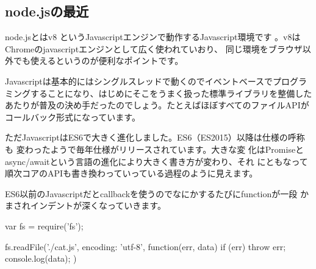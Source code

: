 \documentclass[mingoth,a4paper]{jsarticle}
\begin{document}

\begin{multicols}{2}
{\small

}
\end{multicols}

%
%
%
%




\subsection{node.jsの最近}

node.jsとはv8 というJavascriptエンジンで動作するJavascript環境です
\cite{nodejsorg}。v8はChromeのjavascriptエンジンとして広く使われていおり、
同じ環境をブラウザ以外でも使えるというのが便利なポイントです。

Javascriptは基本的にはシングルスレッドで動くのでイベントベースでプログラ
ミングすることになり、はじめにそこをうまく扱った標準ライブラリを整備した
あたりが普及の決め手だったのでしょう。たとえばほぼすべてのファイルAPIが
コールバック形式になっています。

ただJavascriptはES6で大きく進化しました。ES6（ES2015）以降は仕様の呼称も
変わったようで毎年仕様がリリースされています\cite{nodejs-es6}。大きな変
化はPromiseとasync/awaitという言語の進化により大きく書き方が変わり、それ
にともなって順次コアのAPIも書き換わっていっている過程のように見えます。

ES6以前のJavascriptだとcallbackを使うのでなにかするたびにfunctionが一段
かまされインデントが深くなっていきます。

\begin{commandline}
var fs = require('fs');

fs.readFile('./cat.js', {encoding: 'utf-8'}, function(err, data) {
    if (err) throw err;
    console.log(data);
})
\end{commandline}
\end{document}

